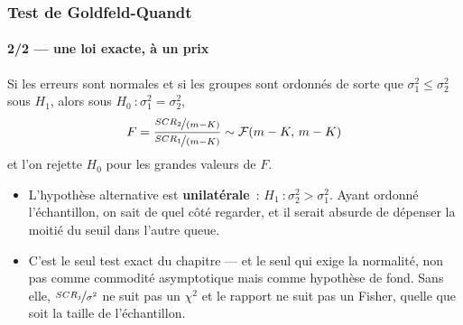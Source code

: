 \documentclass[10pt]{beamer}
\begin{document}
\begin{frame}
  \frametitle{Test de Goldfeld-Quandt}
  \framesubtitle{2/2 --- une loi exacte, à un prix}

  \begin{prop}\label{prop:gq}
    Si les erreurs sont normales et si les groupes sont ordonnés de sorte
    que $\sigma_1^2 \leq \sigma_2^2$ sous $H_1$, alors sous
    $H_0~: \sigma_1^2 = \sigma_2^2$,
    \[
      F = \frac{\nicefrac{SCR_2}{(m-K)}}{\nicefrac{SCR_1}{(m-K)}}
      \sim \mathcal F(m-K,\, m-K)
    \]
    et l'on rejette $H_0$ pour les grandes valeurs de $F$.
  \end{prop}

  \bigskip

  \begin{itemize}

  \item L'hypothèse alternative est \textbf{unilatérale}~: $H_1~: \sigma_2^2 >
    \sigma_1^2$. Ayant ordonné l'échantillon, on sait de quel côté regarder, et
    il serait absurde de dépenser la moitié du seuil dans l'autre queue.\newline

  \item[\dbend] C'est le seul test exact du chapitre — et le seul qui exige la
    normalité, non pas comme commodité asymptotique mais comme hypothèse de
    fond. Sans elle, $\nicefrac{SCR_j}{\sigma^2}$ ne suit pas un $\chi^2$ et le
    rapport ne suit pas un Fisher, quelle que soit la taille de l'échantillon.

  \end{itemize}

\end{frame}
\end{document}
